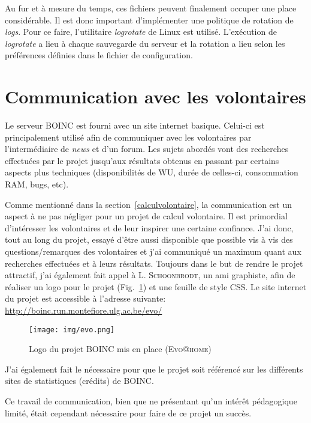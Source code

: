 \documentclass[a4paper, 12pt]{report}
\begin{document}
Au fur et à mesure du temps, ces fichiers peuvent finalement occuper une place considérable. Il est donc important d'implémenter une politique de rotation de \textit{logs}. Pour ce faire, l'utilitaire \textit{logrotate} de Linux est utilisé. L'exécution de \textit{logrotate} a lieu à chaque sauvegarde du serveur et la rotation a lieu selon les préférences définies dans le fichier de configuration. %

\section{Communication avec les volontaires}
Le serveur \textsc{BOINC} est fourni avec un site internet basique. Celui-ci est principalement utilisé afin de communiquer avec les volontaires par l'intermédiaire de \textit{news} et d'un forum. Les sujets abordés vont des recherches effectuées par le projet jusqu'aux résultats obtenus en passant par certains aspects plus techniques (disponibilités de WU, durée de celles-ci, consommation RAM, bugs, etc).

Comme mentionné dans la section~\ref{calculvolontaire}, la communication est un aspect à ne pas négliger pour un projet de calcul volontaire. Il est primordial d'intéresser les volontaires et de leur inspirer une certaine confiance. J'ai donc, tout au long du projet, essayé d'être aussi disponible que possible vis à vis des questions/remarques des volontaires et j'ai communiqué un maximum quant aux recherches effectuées et à leurs résultats.
Toujours dans le but de rendre le projet attractif, j'ai également fait appel à L. \textsc{Schoonbrodt}, un ami graphiste, afin de réaliser un logo pour le projet (Fig.~\ref{evologo}) et une feuille de style CSS. Le site internet du projet est accessible à l'adresse suivante: \url{http://boinc.run.montefiore.ulg.ac.be/evo/}

\begin{figure}[!tb]
\centering
\texttt{[image: img/evo.png]}
\caption{Logo du projet \textsc{BOINC} mis en place (\textsc{Evo@home})}
\label{evologo}
\end{figure}

J'ai également fait le nécessaire pour que le projet soit référencé sur les différents sites de statistiques (crédits) de \textsc{BOINC}.

Ce travail de communication, bien que ne présentant qu'un intérêt pédagogique limité, était cependant nécessaire pour faire de ce projet un succès.
\end{document}

